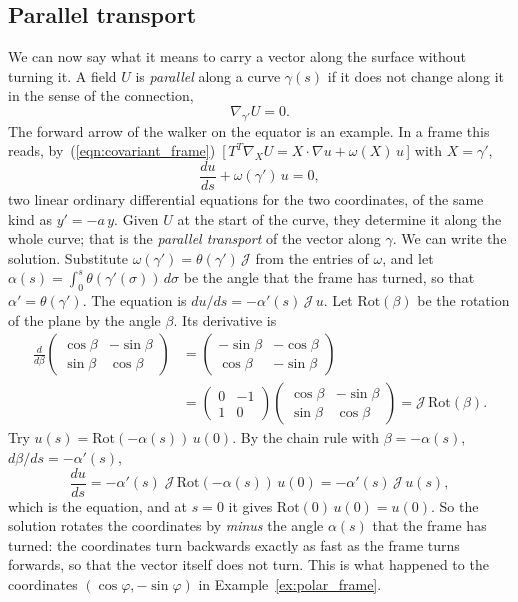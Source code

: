 \subsection{Parallel transport}

We can now say what it means to carry a vector along the surface without turning it. A field $U$ is \emph{parallel} along a curve $\gamma(s)$ if it does not change along it in the sense of the connection,
\begin{equation*}
\nabla_{\gamma'} U = 0 .
\end{equation*}
The forward arrow of the walker on the equator is an example. In a frame this reads, by~(\ref{eqn:covariant_frame})~[\,$T^T\nabla_X U = X\cdot\nabla u + \omega(X)\,u$\,] with $X = \gamma'$,
\begin{equation*}
\frac{du}{ds} + \omega(\gamma')\, u = 0 ,
\end{equation*}
two linear ordinary differential equations for the two coordinates, of the same kind as $y' = -a\, y$. Given $U$ at the start of the curve, they determine it along the whole curve; that is the \emph{parallel transport} of the vector along $\gamma$. We can write the solution. Substitute $\omega(\gamma') = \theta(\gamma')\,\mathcal J$ from the entries of $\omega$, and let $\alpha(s) = \int_0^s \theta(\gamma'(\sigma))\, d\sigma$ be the angle that the frame has turned, so that $\alpha' = \theta(\gamma')$. The equation is $du/ds = -\alpha'(s)\,\mathcal J\, u$. Let $\mathrm{Rot}(\beta)$ be the rotation of the plane by the angle $\beta$. Its derivative is
\begin{align*}
\frac{d}{d\beta}\begin{pmatrix} \cos\beta & -\sin\beta \\ \sin\beta & \cos\beta \end{pmatrix} &= \begin{pmatrix} -\sin\beta & -\cos\beta \\ \cos\beta & -\sin\beta \end{pmatrix} \\
&= \begin{pmatrix} 0 & -1 \\ 1 & 0 \end{pmatrix}\begin{pmatrix} \cos\beta & -\sin\beta \\ \sin\beta & \cos\beta \end{pmatrix} = \mathcal J\,\mathrm{Rot}(\beta) .
\end{align*}
Try $u(s) = \mathrm{Rot}(-\alpha(s))\, u(0)$. By the chain rule with $\beta = -\alpha(s)$, $d\beta/ds = -\alpha'(s)$,
\begin{equation*}
\frac{du}{ds} = -\alpha'(s)\; \mathcal J\, \mathrm{Rot}(-\alpha(s))\, u(0) = -\alpha'(s)\,\mathcal J\, u(s) ,
\end{equation*}
which is the equation, and at $s = 0$ it gives $\mathrm{Rot}(0)\,u(0) = u(0)$. So the solution rotates the coordinates by \emph{minus} the angle $\alpha(s)$ that the frame has turned: the coordinates turn backwards exactly as fast as the frame turns forwards, so that the vector itself does not turn. This is what happened to the coordinates $(\cos\varphi, -\sin\varphi)$ in Example~\ref{ex:polar_frame}.

